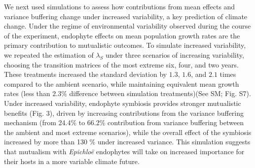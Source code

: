 \documentclass[12pt]{article}
\begin{document}
We next used simulations to assess how contributions from mean effects and variance buffering change under increased variability, a key prediction of climate change.
Under the regime of environmental variability observed during the course of the experiment, endophyte effects on mean population growth rates are the primary contribution to mutualistic outcomes. 
To simulate increased variability, we repeated the estimation of $\lambda_{S}$ under three scenarios of increasing variability, choosing the transition matrices of the most extreme six, four, and two years. 
These treatments increased the standard deviation by $1.3$, $1.6$, and $2.1$ times compared to the ambient scenario, while maintaining equivalent mean growth rates (less than $2.3\%$ difference between simulation treatments)(See SM; Fig. S7).
Under increased variability, endophyte symbiosis provides stronger mutualistic benefits (Fig. 3), driven by increasing contributions from the variance buffering mechanism (from 24.4\% to 66.2\% contribution from variance buffering between the ambient and most extreme scenarios), while the overall effect of the symbiosis increased by more than 130 \% under increased variance.
This simulation suggests that mutualism with \emph{Epichlo\"{e}} endophytes will take on increased importance for their hosts in a more variable climate future.
\end{document}
